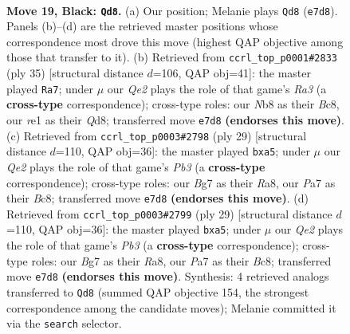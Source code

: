 \documentclass[11pt]{article}
\begin{document}
\clearpage

\begin{figure}[p]\centering
\begin{subfigure}{0.46\textwidth}\centering
\resizebox{\linewidth}{!}{%
\newchessgame
\chessboard[
  setfen={rnb1r1k1/pp2qpb1/4pnp1/2Qp3p/P2P3P/1B3NP1/RPP2P1K/1NB1R3 b - - 2 19},
  showmover=false,
  pgfstyle=straightmove, color=movearrow, markmove={e7-d8}
]}
\caption{}
\end{subfigure}\hfill
\begin{subfigure}{0.46\textwidth}\centering
\resizebox{\linewidth}{!}{%
\newchessgame
\chessboard[
  setfen={2bqk2r/1p2npb1/r1p3p1/p1N1p1Pp/P1P5/1R1PB2P/1P3P2/3QKB1R b Kk - 9 18},
  showmover=false,
  pgfstyle=straightmove, color=movearrow, markmove={a6-a7}
]}
\caption{}
\end{subfigure}
\\[4pt]
\begin{subfigure}{0.46\textwidth}\centering
\resizebox{\linewidth}{!}{%
\newchessgame
\chessboard[
  setfen={r1bq1rk1/p3bppp/1p2p3/P1pn4/8/1BPP1N1Q/2PB1PPP/R3R1K1 b - - 0 15},
  showmover=false,
  pgfstyle=straightmove, color=movearrow, markmove={b6-a5}
]}
\caption{}
\end{subfigure}\hfill
\begin{subfigure}{0.46\textwidth}\centering
\resizebox{\linewidth}{!}{%
\newchessgame
\chessboard[
  setfen={r1bq1rk1/p3bppp/1p2p3/P1pn4/8/1BPP1N1Q/2PB1PPP/R3R1K1 b - - 0 15},
  showmover=false,
  pgfstyle=straightmove, color=movearrow, markmove={b6-a5}
]}
\caption{}
\end{subfigure}
\caption{\textbf{Move 19, Black: \texttt{Qd8}.} (a) Our position; Melanie plays \texttt{Qd8} (\texttt{e7d8}). Panels (b)--(d) are the retrieved master positions whose correspondence most drove this move (highest QAP objective among those that transfer to it). (b) Retrieved from \texttt{ccrl\_top\_p0001\#2833} (ply 35) [structural distance $d$=106, QAP obj=41]: the master played \texttt{Ra7}; under $\mu$ our \emph{Qe2} plays the role of that game's \emph{Ra3} (a \textbf{cross-type} correspondence); cross-type roles: our \emph{N}b8 as their \emph{B}c8, our \emph{r}e1 as their \emph{Q}d8; transferred move \texttt{e7d8} \textbf{(endorses this move)}. (c) Retrieved from \texttt{ccrl\_top\_p0003\#2798} (ply 29) [structural distance $d$=110, QAP obj=36]: the master played \texttt{bxa5}; under $\mu$ our \emph{Qe2} plays the role of that game's \emph{Pb3} (a \textbf{cross-type} correspondence); cross-type roles: our \emph{B}g7 as their \emph{R}a8, our \emph{P}a7 as their \emph{B}c8; transferred move \texttt{e7d8} \textbf{(endorses this move)}. (d) Retrieved from \texttt{ccrl\_top\_p0003\#2799} (ply 29) [structural distance $d$=110, QAP obj=36]: the master played \texttt{bxa5}; under $\mu$ our \emph{Qe2} plays the role of that game's \emph{Pb3} (a \textbf{cross-type} correspondence); cross-type roles: our \emph{B}g7 as their \emph{R}a8, our \emph{P}a7 as their \emph{B}c8; transferred move \texttt{e7d8} \textbf{(endorses this move)}. Synthesis: 4 retrieved analogs transferred to \texttt{Qd8} (summed QAP objective 154, the strongest correspondence among the candidate moves); Melanie committed it via the \texttt{search} selector.}

\end{figure}
\end{document}
